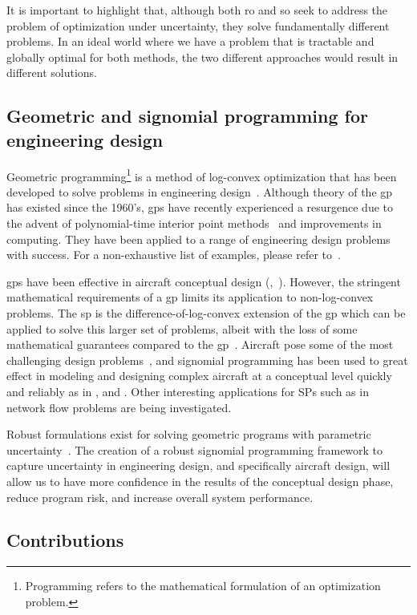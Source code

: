 It is important to highlight that,
although both \gls{ro} and \gls{so} seek to address the problem
of optimization under uncertainty, they solve fundamentally different problems. In an ideal world where
we have a problem that is tractable and globally optimal for both methods, the two different
approaches would result in different solutions.

\subsection{Geometric and signomial programming for engineering design}

Geometric programming\footnote{Programming refers to the mathematical formulation of an optimization problem.}
is a method of log-convex optimization that has been developed
to solve problems in engineering design~\cite{Duffin1967}. Although theory of the \gls{gp} has existed since
the 1960's, \gls{gp}s have recently experienced a resurgence due to the advent of polynomial-time
interior point methods~\cite{Nesterov1994} and improvements in computing. They have been
applied to a range of engineering design problems with success. For a non-exhaustive list of examples,
please refer to~\cite{Boyd2007}.

\gls{gp}s have been effective in aircraft conceptual design
(\cite{Hoburg2013},~\cite{Burton2017}).
However, the stringent mathematical requirements of a \gls{gp} limits its application to non-log-convex problems.
The \gls{sp} is the difference-of-log-convex extension of the \gls{gp} which can be applied to
solve this larger set of problems, albeit with the loss of some mathematical guarantees compared to the \gls{gp}~\cite{Kirschen2018}.
Aircraft pose some of the most challenging design problems~\cite{York2018}, and signomial programming
has been used to great effect in modeling and designing complex aircraft at a conceptual level quickly
and reliably as in \cite{York2018}, \cite{Kirschen2016} and \cite{Kirschen2018}.
Other interesting applications for SPs such as in network flow problems are being investigated.

Robust formulations exist for solving geometric programs with parametric uncertainty~\cite{Saab2018}.
The creation of a robust signomial programming framework to capture uncertainty in engineering
design, and specifically aircraft design, will allow us to have more confidence in the results
of the conceptual design phase, reduce program risk, and increase overall system performance.

\subsection{Contributions}

